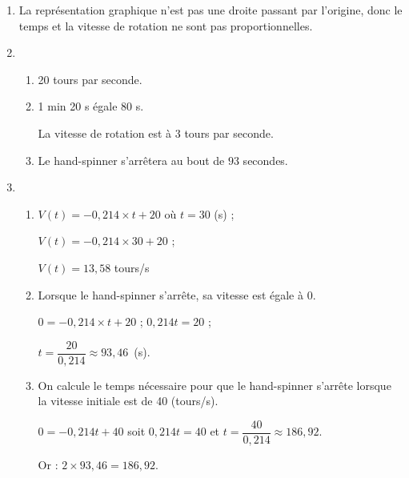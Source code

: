 
\medskip

\begin{enumerate}
\item La représentation graphique n'est pas une droite passant par l'origine, donc le temps et la vitesse de rotation ne sont pas proportionnelles.
\item 
	\begin{enumerate}
		\item 20 tours par seconde.
		\item 1 min 20 s égale 80 s.
		
La vitesse de rotation est à 3 tours par seconde.
		\item Le hand-spinner s'arrêtera au bout de $93$ secondes.
 	\end{enumerate}
\item  
	\begin{enumerate}
		\item $V(t) = - 0,214 \times t + 20$ où $t = 30$ (s) ;
		
$V(t) = -0,214 \times 30 + 20$ ;
		
$V(t) = 13,58$ tours/s
		\item Lorsque le hand-spinner s'arrête, sa vitesse est égale à $0$.
		
$0 = -0,214 \times t + 20$ ; $0,214t = 20$ ;

$t = \dfrac{20}{0,214} \approx 93,46$~(s).
		\item On calcule le temps nécessaire pour que le hand-spinner s'arrête lorsque la vitesse initiale est de 40 (tours/s).

$0 = - 0,214t + 40$  soit $0,214t = 40$ et $t = \dfrac{40}{0,214} \approx 186,92$.

Or : $2 \times 93,46 = 186,92$.
	\end{enumerate}
\end{enumerate}

